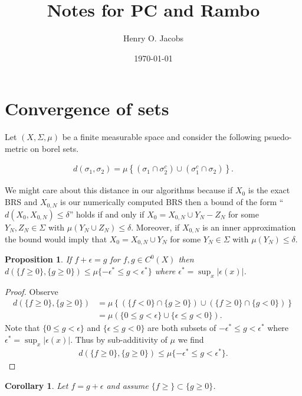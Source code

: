 \documentclass[12pt]{amsart}
\title{Notes for PC and Rambo}
\author{Henry O. Jacobs}
\date{\today}
\newtheorem{prop}[thm]{Proposition}
\newtheorem{cor}[thm]{Corollary}
\begin{document}
\maketitle

\section{Convergence of sets}
Let $(X,\Sigma, \mu)$ be a finite measurable space and consider the following psuedo-metric on borel sets.

\begin{align*}
	d(\sigma_{1}, \sigma_{2}) = \mu \left\{ (\sigma_{1} \cap \sigma_{2}^{c} ) \cup  (\sigma_{1}^{c} \cap \sigma_{2}) \right\}.
\end{align*}

We might care about this distance in our algorithms because if $X_{0}$ is the exact BRS and $X_{0,N}$ is our numerically computed BRS
then a bound of the form ``$d( X_{0} , X_{0,N}) \leq \delta$'' holds if and only if $X_{0} = X_{0,N} \cup Y_{N} - Z_{N}$ for some $Y_{N},Z_{N} \in \Sigma$ with $\mu(Y_{N} \cup Z_{N}) \leq \delta$.
Moreover, if $X_{0,N}$ is an inner approximation the bound would imply that $X_{0} = X_{0,N} \cup Y_{N}$ for some $Y_{N} \in \Sigma$ with $\mu(Y_{N}) \leq \delta$.

\begin{prop}
	If $f +\epsilon = g$ for $f,g \in C^{0}(X)$ then $d( \{ f \geq 0 \}  , \{ g \geq 0 \} ) \leq \mu\{ -\epsilon^{*} \leq g < \epsilon^{*} \}$ where $\epsilon^{*} = \sup_{x} | \epsilon(x) |$.
\end{prop}

\begin{proof}
  Observe
  \begin{align*}
  	d( \{ f\geq 0 \} , \{ g \geq 0 \} ) &= \mu \left\{  \left( \{ f < 0 \} \cap \{ g \geq 0 \} \right) \cup \left( \{ f \geq 0 \} \cap \{ g < 0 \} \right) \right\} \\
		&= \mu \left( \{ 0 \leq g < \epsilon \} \cup \{ \epsilon \leq g < 0 \} \right).
  \end{align*}
  Note that $\{ 0 \leq g < \epsilon \}$ and $\{ \epsilon \leq g < 0\}$ are both subsets of $-\epsilon^{*} \leq g < \epsilon^{*}$
  where $\epsilon^{*} = \sup_{x} | \epsilon(x) |$.  Thus by sub-additivity of $\mu$ we find
  \begin{align*}
  	d( \{ f \geq 0 \} , \{ g \geq 0 \} ) \leq \mu \{ -\epsilon^{*} \leq g < \epsilon^{*} \}.
  \end{align*}
  \end{proof}

\begin{cor}
	Let $f = g + \epsilon$ and assume $\{ f \geq \} \subset \{ g \geq 0 \}$.
\end{cor}



\end{document}
